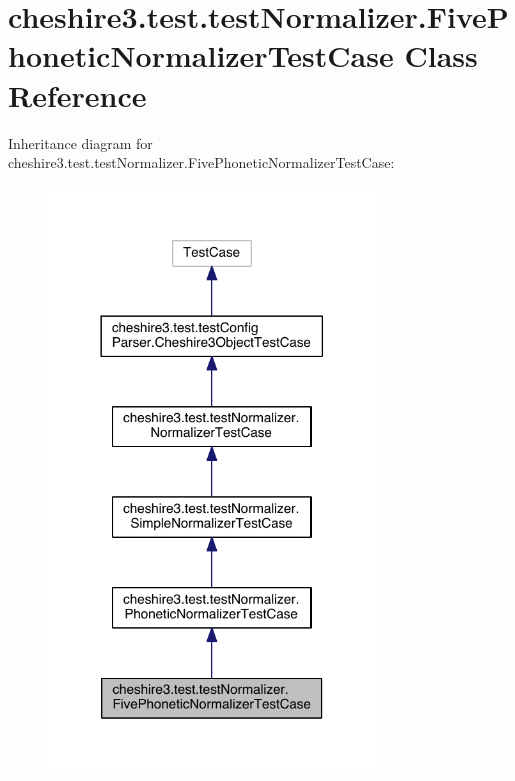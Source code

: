 \hypertarget{classcheshire3_1_1test_1_1test_normalizer_1_1_five_phonetic_normalizer_test_case}{\section{cheshire3.\-test.\-test\-Normalizer.\-Five\-Phonetic\-Normalizer\-Test\-Case Class Reference}
\label{classcheshire3_1_1test_1_1test_normalizer_1_1_five_phonetic_normalizer_test_case}
}


Inheritance diagram for cheshire3.\-test.\-test\-Normalizer.\-Five\-Phonetic\-Normalizer\-Test\-Case\-:
\nopagebreak
\begin{figure}[H]
\begin{center}
\leavevmode
\includegraphics[width=246pt]{classcheshire3_1_1test_1_1test_normalizer_1_1_five_phonetic_normalizer_test_case__inherit__graph}
\end{center}
\end{figure}


